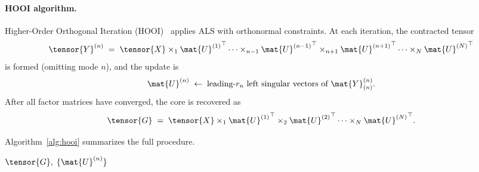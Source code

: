 \paragraph{HOOI algorithm.}
Higher-Order Orthogonal Iteration (HOOI)~\cite{de2000best} applies ALS
with orthonormal constraints.
At each iteration, the contracted tensor
\begin{equation}
  \tensor{Y}^{(n)}
  \;=\; \tensor{X}
        \times_1 {\mat{U}^{(1)}}^\top
        \cdots
        \times_{n-1} {\mat{U}^{(n-1)}}^\top
        \times_{n+1} {\mat{U}^{(n+1)}}^\top
        \cdots
        \times_N {\mat{U}^{(N)}}^\top
  \label{eq:hooi_contracted}
\end{equation}
is formed (omitting mode $n$), and the update is
\begin{equation}
  \mat{U}^{(n)}
  \;\leftarrow\;
  \text{leading-}r_n\text{ left singular vectors of }
  \mat{Y}^{(n)}_{(n)}.
  \label{eq:hooi_update}
\end{equation}
After all factor matrices have converged, the core is recovered as
\begin{equation}
  \tensor{G}
  \;=\; \tensor{X}
        \times_1 {\mat{U}^{(1)}}^\top
        \times_2 {\mat{U}^{(2)}}^\top
        \cdots
        \times_N {\mat{U}^{(N)}}^\top.
  \label{eq:hooi_core}
\end{equation}

Algorithm~\ref{alg:hooi} summarizes the full procedure.

\begin{algorithm}[t]
  \caption{HOOI for Tucker decomposition (Frobenius norm)}
  \label{alg:hooi}

  \BlankLine
  \BlankLine
  \Return $\tensor{G},\; \{\mat{U}^{(n)}\}$\;
\end{algorithm}


